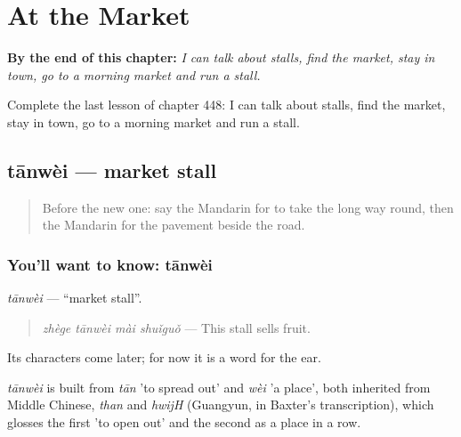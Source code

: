 
\chapter{At the Market}
\label{ch:zh-at-the-market}

\begin{chapteropening}
\textbf{By the end of this chapter:} \emph{I can talk about stalls, find the market, stay in town, go to a morning market and run a stall.}

Complete the last lesson of chapter 448: I can talk about stalls, find the market, stay in town, go to a morning market and run a stall.
\end{chapteropening}

\section[tānwèi]{tānwèi — market stall}

\label{lesson:ZH-C448-tanwei}



\begin{quote}
Before the new one: say the Mandarin for to take the long way round, then the Mandarin for the pavement beside the road.
\end{quote}

\subsection*{You'll want to know: tānwèi}
\emph{tānwèi} — \textquotedblleft{}market stall\textquotedblright{}.

\begin{quote}
\emph{zhège tānwèi mài shuǐguǒ} — This stall sells fruit.
\end{quote}

Its characters come later; for now it is a word for the ear.

\begin{cousinweb}
\emph{tānwèi} is built from \emph{tān} 'to spread out' and \emph{wèi} 'a place', both inherited from Middle Chinese, \emph{than} and \emph{hwijH} (Guangyun, in Baxter's transcription), which glosses the first 'to open out' and the second as a place in a row.
\end{cousinweb}

